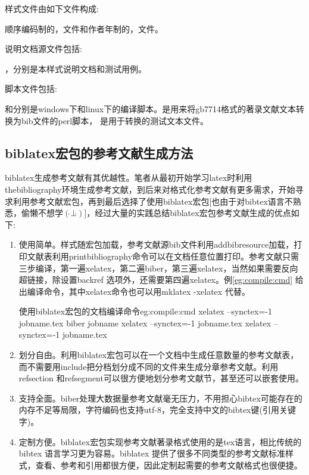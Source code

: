 样式文件由如下文件构成:

顺序编码制的，文件和作者年制的，文件。

说明文档源文件包括:

，分别是本样式说明文档和测试用例。

脚本文件包括:

和分别是windows下和linux下的编译脚本。是用来将gb7714格式的著录文献文本转换为bib文件的perl脚本，
是用于转换的测试文本文件。

\subsection{biblatex宏包的参考文献生成方法}
biblatex生成参考文献有其优越性。笔者从最初开始学习latex时利用thebibliography环境生成参考文献，到后来对格式化参考文献有更多需求，开始寻求利用参考文献宏包，再到最后选择了使用biblatex宏包[也由于对bibtex语言不熟悉，偷懒不想学$( \hat{} \bot \hat{} )$]，经过大量的实践总结biblatex宏包参考文献生成的优点如下:

\begin{enumerate}
\item 使用简单。样式随宏包加载，参考文献源bib文件利用addbibresource加载，打印文献表利用printbibliography命令可以在文档任意位置打印。参考文献只需三步编译，第一遍xelatex，第二遍biber，第三遍xelatex，当然如果需要反向超链接，除设置backref 选项外，还需要第四遍xelatex。例\ref{eg:compile:cmd} 给出编译命令，其中xelatex命令也可以用mklatex -xelatex 代替。

    \begin{codetex}{使用biblatex宏包的文档编译命令}{eg:compile:cmd}
    xelatex --synctex=-1 jobname.tex
    biber jobname
    xelatex --synctex=-1 jobname.tex
    xelatex --synctex=-1 jobname.tex
    \end{codetex}

\item 划分自由。利用biblatex宏包可以在一个文档中生成任意数量的参考文献表，而不需要用include把分档划分成不同的文件来生成分章参考文献。利用refsection 和refsegment可以很方便地划分参考文献节，甚至还可以嵌套使用。

\item 支持全面。biber处理大数据量参考文献毫无压力，不用担心bibtex可能存在的内存不足等局限，字符编码也支持utf-8，完全支持中文的bibtex键(引用关键字)。

\item 定制方便。biblatex宏包实现参考文献著录格式使用的是tex语言，相比传统的bibtex 语言学习更为容易。biblatex 提供了很多不同类型的参考文献标准样式，查看、参考和引用都很方便，因此定制起需要的参考文献格式也很便捷。
\end{enumerate}


